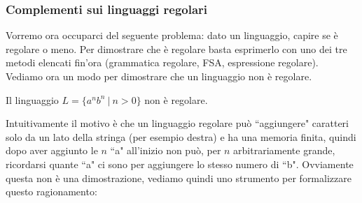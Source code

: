 \documentclass[12pt]{article}
\numberwithin{theorem}{subsection}
\begin{document}
\subsubsection{Complementi sui linguaggi regolari}
Vorremo ora occuparci del seguente problema: dato un linguaggio, capire se è regolare o meno. Per dimostrare che è regolare basta esprimerlo con uno dei tre metodi elencati fin'ora (grammatica regolare, FSA, espressione regolare). Vediamo ora un modo per dimostrare che un linguaggio non è regolare.

\begin{example}
	Il linguaggio $L=\{ a^n b^n \ \vert \ n > 0 \}$ non è regolare.
\end{example}
Intuitivamente il motivo è che un linguaggio regolare può ``aggiungere" caratteri solo da un lato della stringa (per esempio destra) e ha una memoria finita, quindi dopo aver aggiunto le $n$ ``a" all'inizio non può, per $n$ arbitrariamente grande, ricordarsi quante ``a" ci sono per aggiungere lo stesso numero di ``b". Ovviamente questa non è una dimostrazione, vediamo quindi uno strumento per formalizzare questo ragionamento:
\end{document}
